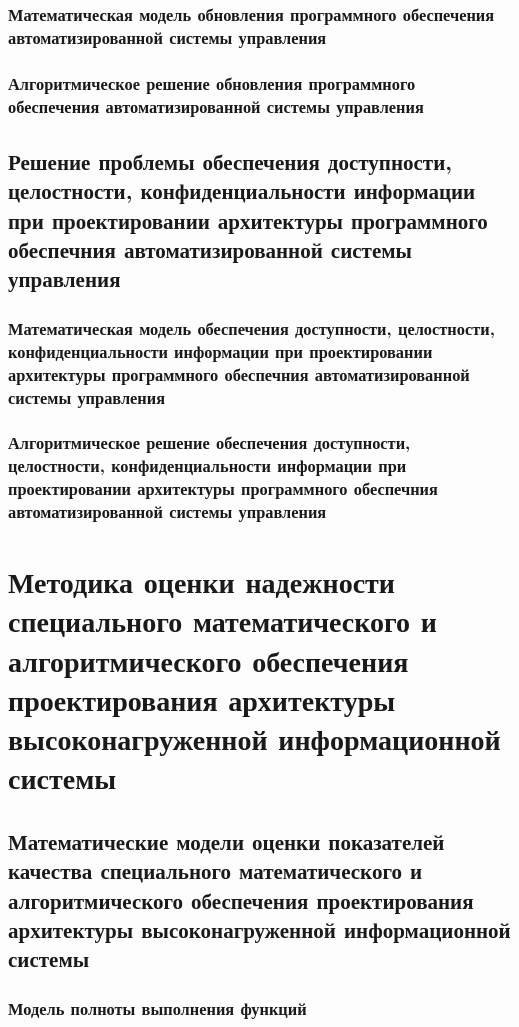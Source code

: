 \subsection{Математическая модель обновления программного обеспечения автоматизированной системы управления}\label{sec:ch2/sec6/sub1}
\subsection{Алгоритмическое решение обновления программного обеспечения автоматизированной системы управления}\label{sec:ch2/sec6/sub2}
\section{Решение проблемы обеспечения доступности, целостности, конфиденциальности информации при проектировании архитектуры программного обеспечния автоматизированной системы управления}\label{sec:ch2/sec7}
\subsection{Математическая модель обеспечения доступности, целостности, конфиденциальности информации при проектировании архитектуры программного обеспечния автоматизированной системы управления}\label{sec:ch2/sec7/sub1}
\subsection{Алгоритмическое решение обеспечения доступности, целостности, конфиденциальности информации при проектировании архитектуры программного обеспечния автоматизированной системы управления}\label{sec:ch2/sec7/sub2}


\chapter{Методика оценки надежности специального математического и алгоритмического обеспечения проектирования архитектуры высоконагруженной информационной системы}\label{ch:ch5}

\section{Математические модели оценки показателей качества специального математического и алгоритмического обеспечения проектирования архитектуры высоконагруженной информационной системы}\label{sec:ch3/sect1}
\subsection{Модель полноты выполнения функций}\label{subsec:ch3/sect2/sub1}
